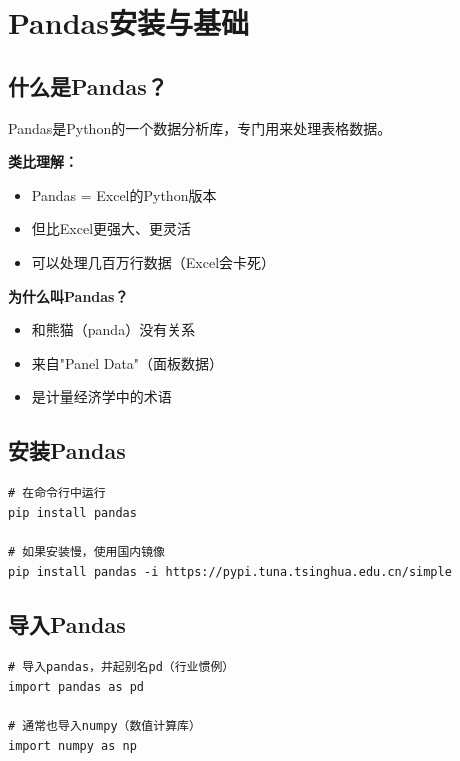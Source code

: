\documentclass[12pt,a4paper]{article}
\begin{document}
\section{Pandas安装与基础}

\subsection{什么是Pandas？}

\begin{knowledgebox}[Pandas是什么？]
Pandas是Python的一个数据分析库，专门用来处理表格数据。

\textbf{类比理解：}
\begin{itemize}
    \item Pandas = Excel的Python版本
    \item 但比Excel更强大、更灵活
    \item 可以处理几百万行数据（Excel会卡死）
\end{itemize}

\textbf{为什么叫Pandas？}
\begin{itemize}
    \item 和熊猫（panda）没有关系
    \item 来自"Panel Data"（面板数据）
    \item 是计量经济学中的术语
\end{itemize}
\end{knowledgebox}

\subsection{安装Pandas}

\begin{lstlisting}[caption={安装Pandas}]
# 在命令行中运行
pip install pandas

# 如果安装慢，使用国内镜像
pip install pandas -i https://pypi.tuna.tsinghua.edu.cn/simple
\end{lstlisting}

\subsection{导入Pandas}

\begin{lstlisting}[caption={导入Pandas}]
# 导入pandas，并起别名pd（行业惯例）
import pandas as pd

# 通常也导入numpy（数值计算库）
import numpy as np
\end{lstlisting}
\end{document}
